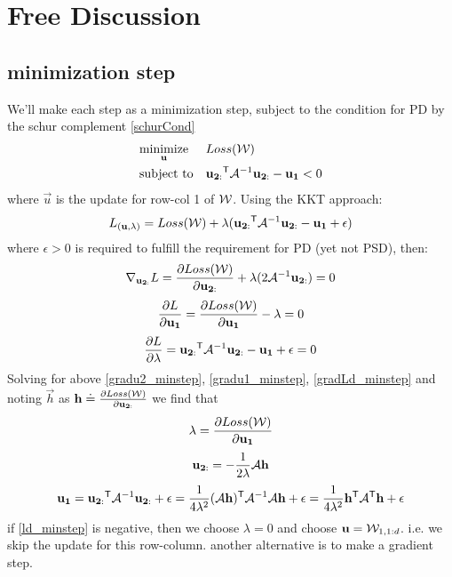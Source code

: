 \section{Free Discussion}

\subsection{minimization step}
We'll make each step as a minimization step, subject to the condition for PD by the schur complement  \eqref{schurCond}
\begin{equation}
\begin{aligned}
& \underset{\mathbf{u}}{\text{minimize}}
& & Loss(\mathcal{W}) \\
& \text{subject to}
& & \mathbf{u_{2:}}{}^\mathsf{T} \mathcal{A}^{-1} \mathbf{u_{2:}} - \mathbf{u_{1}} < 0
\end{aligned}
\end{equation}
where $\vec{u}$ is the update for row-col 1 of $\mathcal{W}$. Using the KKT approach:
\begin{equation}
L_{(\mathbf{u}, \lambda)} = Loss(\mathcal{W}) + \lambda ( \mathbf{u_{2:}}{}^\mathsf{T} \mathcal{A}^{-1} \mathbf{u_{2:}} - \mathbf{u_{1}} + \epsilon)
\end{equation}
where $\epsilon > 0 $ is required to fulfill the requirement for PD (yet not PSD), then:
\begin{equation}
\nabla_{\mathbf{u_{2:}}} L = \frac{\partial {Loss(\mathcal{W})}}{\partial \mathbf{u_{2:}}}  + \lambda ( 2 \mathcal{A}^{-1} \mathbf{u_{2:}}) = 0
\label{gradu2_minstep}
\end{equation}
\begin{equation}
\frac{\partial {L}}{\partial \mathbf{u_1}} = \frac{\partial {Loss(\mathcal{W})}}{\partial \mathbf{u_1}} - \lambda = 0
\label{gradu1_minstep}
\end{equation}
\begin{equation}
\frac{\partial {L}}{\partial \lambda} = \mathbf{u_{2:}}{}^\mathsf{T} \mathcal{A}^{-1} \mathbf{u_{2:}} - \mathbf{u_{1}} + \epsilon = 0
\label{gradLd_minstep}
\end{equation}
Solving for above \eqref{gradu2_minstep}, \eqref{gradu1_minstep}, \eqref{gradLd_minstep} and noting $\vec{h}$ as $\mathbf{h} \doteq \frac{\partial {Loss(\mathcal{W})}}{\partial \mathbf{u_{2:}}}$ we find that
\begin{equation}
\lambda = \frac{\partial {Loss(\mathcal{W})}}{\partial \mathbf{u_1}} 
\label{ld_minstep}
\end{equation}
\begin{equation}
\mathbf{u_{2:}} = -\frac{1}{2 \lambda}\mathcal{A} \mathbf{h}
\label{u2_minstep}
\end{equation}
\begin{equation}
\mathbf{u_{1}} = \mathbf{u_{2:}}{}^\mathsf{T} \mathcal{A}^{-1} \mathbf{u_{2:}} + \epsilon = \frac{1}{4 \lambda^2}(\mathcal{A} \mathbf{h}){}^\mathsf{T} \mathcal{A}^{-1} \mathcal{A} \mathbf{h} + \epsilon = \frac{1}{4 \lambda^2} \mathbf{h}{}^\mathsf{T} \mathcal{A}{}^\mathsf{T} \mathbf{h} + \epsilon
\label{u1_minstep}
\end{equation}
if \eqref{ld_minstep} is negative, then we choose $\lambda = 0$ and choose $\mathbf{u} = \mathcal{W}_{1,1:d}$. i.e. we skip the update for this row-column. another alternative is to make a gradient step.


